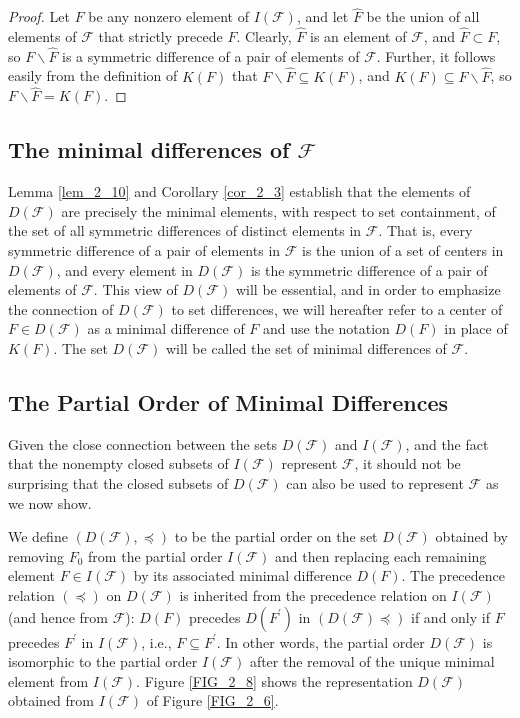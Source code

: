 \begin{proof}
    Let $F$ be any nonzero element of $I(\mathcal{F})$, and let $\hat{F}$ be the union of all elements of $\mathcal{F}$ that strictly precede $F$. Clearly, $\hat{F}$ is an element of $\mathcal{F}$, and $\hat{F} \subset F$, so $F \backslash \hat{F}$ is a symmetric difference of a pair of elements of $\mathcal{F}$. Further, it follows easily from the definition of $K(F)$ that $F \backslash \hat{F} \subseteq K(F)$, and $K(F) \subseteq F \backslash \hat{F}$, so $F \backslash \hat{F}=K(F)$.
\end{proof}

\subsection{The minimal differences of $\mathcal{F}$}


Lemma \ref{lem_2_10} and Corollary \ref{cor_2_3} establish that the elements of $D(\mathcal{F})$ are precisely the minimal elements, with respect to set containment, of the set of all symmetric differences of distinct elements in $\mathcal{F}$. That is, every symmetric difference of a pair of elements in $\mathcal{F}$ is the union of a set of centers in $D(\mathcal{F})$, and every element in $D(\mathcal{F})$ is the symmetric difference of a pair of elements of $\mathcal{F}$. This view of $D(\mathcal{F})$ will be essential, and in order to emphasize the connection of $D(\mathcal{F})$ to set differences, we will hereafter refer to a center of $F \in D(\mathcal{F})$ as a minimal difference of $F$ and use the notation $D(F)$ in place of $K(F)$. The set $D(\mathcal{F})$ will be called the set of minimal differences of $\mathcal{F}$.

\subsection{The Partial Order of Minimal Differences}
Given the close connection between the sets $D(\mathcal{F})$ and $I(\mathcal{F})$, and the fact that the nonempty closed subsets of $I(\mathcal{F})$ represent $\mathcal{F}$, it should not be surprising that the closed subsets of $D(\mathcal{F})$ can also be used to represent $\mathcal{F}$ as we now show.

We define $(D(\mathcal{F}), \preceq)$ to be the partial order on the set $D(\mathcal{F})$ obtained by removing $F_0$ from the partial order $I(\mathcal{F})$ and then replacing each remaining element $F \in I(\mathcal{F})$ by its associated minimal difference $D(F)$. The precedence relation $(\preceq)$ on $D(\mathcal{F})$ is inherited from the precedence relation on $I(\mathcal{F})$ (and hence from $\mathcal{F}$): $D(F)$ precedes $D\left(F^{\prime}\right)$ in $(D(\mathcal{F}) \preceq)$ if and only if $F$ precedes $F^{\prime}$ in $I(\mathcal{F})$, i.e., $F \subseteq F^{\prime}$. In other words, the partial order $D(\mathcal{F})$ is isomorphic to the partial order $I(\mathcal{F})$ after the removal of the unique minimal element from $I(\mathcal{F})$. Figure \ref{FIG_2_8} shows the representation $D(\mathcal{F})$ obtained from $I(\mathcal{F})$ of Figure \ref{FIG_2_6}.

